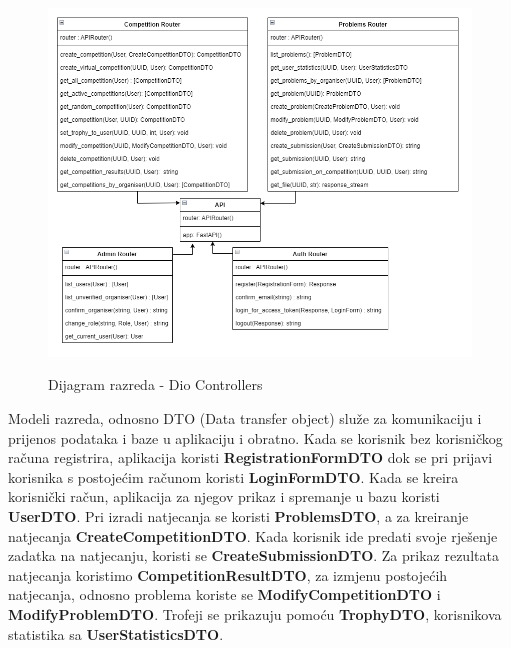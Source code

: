 			\begin{figure}[H]
				\centering
				\includegraphics[width=\linewidth]{slike/dijagram_razreda.png}
				\label{fig:implenetacija1}
				\caption{Dijagram razreda - Dio Controllers}
			\end{figure}
			
			\eject
			
			Modeli razreda, odnosno DTO (Data transfer object) služe za komunikaciju i prijenos podataka i baze u aplikaciju i obratno. Kada se korisnik bez korisničkog računa registrira, aplikacija koristi \textbf{RegistrationFormDTO} dok se pri prijavi korisnika s postojećim računom koristi \textbf{LoginFormDTO}. Kada se kreira korisnički račun, aplikacija za njegov prikaz i spremanje u bazu koristi \textbf{UserDTO}. Pri izradi natjecanja se koristi \textbf{ProblemsDTO}, a za kreiranje natjecanja \textbf{CreateCompetitionDTO}. Kada korisnik ide predati svoje rješenje zadatka na natjecanju, koristi se \textbf{CreateSubmissionDTO}. Za prikaz rezultata natjecanja koristimo \textbf{CompetitionResultDTO}, za izmjenu postojećih natjecanja, odnosno problema koriste se \textbf{ModifyCompetitionDTO} i \textbf{ModifyProblemDTO}. Trofeji se prikazuju pomoću \textbf{TrophyDTO}, korisnikova statistika sa \textbf{UserStatisticsDTO}.

